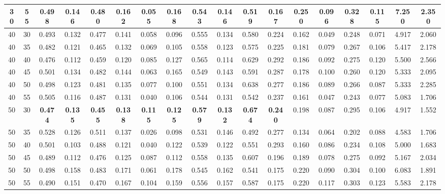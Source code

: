 \begin{longtable}[c]{|c|c|c|c|c|c|c|c|c|c|c|c|c|c|c|c|c|c|}
 30 & 55 & 0.498 & 0.146 & 0.480 & 0.162 & 0.055 & 0.168 & 0.543 & 0.146 & 0.519 & 0.167 & 0.250 & 0.096 & 0.328 & 0.115 & 7.250 & 2.350  \\ \hline 
 40 & 30 & 0.493 & 0.132 & 0.477 & 0.141 & 0.058 & 0.096 & 0.555 & 0.134 & 0.580 & 0.224 & 0.162 & 0.049 & 0.248 & 0.071 & 4.917 & 2.060  \\ \hline 
 40 & 35 & 0.482 & 0.121 & 0.465 & 0.132 & 0.069 & 0.105 & 0.558 & 0.123 & 0.575 & 0.225 & 0.181 & 0.079 & 0.267 & 0.106 & 5.417 & 2.178  \\ \hline 
 40 & 40 & 0.476 & 0.112 & 0.459 & 0.120 & 0.085 & 0.127 & 0.565 & 0.114 & 0.629 & 0.292 & 0.186 & 0.092 & 0.275 & 0.120 & 5.500 & 2.566  \\ \hline 
 40 & 45 & 0.501 & 0.134 & 0.482 & 0.144 & 0.063 & 0.165 & 0.549 & 0.143 & 0.591 & 0.287 & 0.178 & 0.100 & 0.260 & 0.120 & 5.333 & 2.095  \\ \hline 
 40 & 50 & 0.498 & 0.123 & 0.481 & 0.135 & 0.077 & 0.100 & 0.551 & 0.134 & 0.638 & 0.277 & 0.186 & 0.089 & 0.266 & 0.087 & 5.333 & 2.285  \\ \hline 
 40 & 55 & 0.505 & 0.116 & 0.487 & 0.131 & 0.040 & 0.106 & 0.544 & 0.131 & 0.542 & 0.237 & 0.161 & 0.047 & 0.243 & 0.077 & 5.083 & 1.706  \\ \hline 
 50 & 30 & \cellcolor{gray!20} \textbf{0.474} & \cellcolor{gray!20} \textbf{0.135} & \cellcolor{gray!20} \textbf{0.455} & \cellcolor{gray!20} \textbf{0.138} & \cellcolor{gray!20} \textbf{0.115} & \cellcolor{gray!20} \textbf{0.125} & \cellcolor{gray!20} \textbf{0.579} & \cellcolor{gray!20} \textbf{0.132} & \cellcolor{gray!20} \textbf{0.674} & \cellcolor{gray!20} \textbf{0.240} & 0.198 & 0.087 & 0.295 & 0.106 & 4.917 & 1.552  \\ \hline 
 50 & 35 & 0.528 & 0.126 & 0.511 & 0.137 & 0.026 & 0.098 & 0.531 & 0.146 & 0.492 & 0.277 & 0.134 & 0.064 & 0.202 & 0.088 & 4.583 & 1.706  \\ \hline 
 50 & 40 & 0.501 & 0.103 & 0.488 & 0.121 & 0.040 & 0.122 & 0.539 & 0.122 & 0.551 & 0.293 & 0.160 & 0.086 & 0.234 & 0.108 & 5.000 & 1.683  \\ \hline 
 50 & 45 & 0.489 & 0.112 & 0.476 & 0.125 & 0.087 & 0.112 & 0.558 & 0.135 & 0.607 & 0.196 & 0.189 & 0.078 & 0.275 & 0.092 & 5.167 & 2.034  \\ \hline 
 50 & 50 & 0.498 & 0.158 & 0.483 & 0.171 & 0.061 & 0.178 & 0.545 & 0.162 & 0.541 & 0.175 & 0.220 & 0.090 & 0.304 & 0.100 & 6.083 & 1.891  \\ \hline 
 50 & 55 & 0.490 & 0.151 & 0.470 & 0.167 & 0.104 & 0.159 & 0.556 & 0.157 & 0.587 & 0.175 & 0.220 & 0.117 & 0.303 & 0.123 & 5.583 & 2.178  \\ \hline 

\end{longtable}
